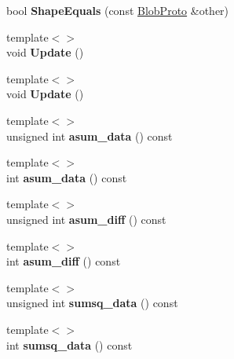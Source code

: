 \begin{DoxyCompactItemize}
\mbox{\label{classcaffe_1_1_blob_aaf5af1d79ac66f15dd5ebe504b36efcd}} 
bool {\bfseries Shape\+Equals} (const \mbox{\hyperlink{classcaffe_1_1_blob_proto}{Blob\+Proto}} \&other)
\item 
\mbox{\label{classcaffe_1_1_blob_a128b3c929b6282d8741543044b81894b}} 
{\footnotesize template$<$$>$ }\\void {\bfseries Update} ()
\item 
\mbox{\label{classcaffe_1_1_blob_a7da970e54e58626753ddd73955164481}} 
{\footnotesize template$<$$>$ }\\void {\bfseries Update} ()
\item 
\mbox{\label{classcaffe_1_1_blob_aaca009ba67cbcd12c18cf3a766db934f}} 
{\footnotesize template$<$$>$ }\\unsigned int {\bfseries asum\+\_\+data} () const
\item 
\mbox{\label{classcaffe_1_1_blob_a7104c5eb03f4307dd65bb098ad4c1a66}} 
{\footnotesize template$<$$>$ }\\int {\bfseries asum\+\_\+data} () const
\item 
\mbox{\label{classcaffe_1_1_blob_aba736c86a9d3bdc798bcc6551725f9a9}} 
{\footnotesize template$<$$>$ }\\unsigned int {\bfseries asum\+\_\+diff} () const
\item 
\mbox{\label{classcaffe_1_1_blob_a1725a104ce88a7eb466f1d1fb3f9cf95}} 
{\footnotesize template$<$$>$ }\\int {\bfseries asum\+\_\+diff} () const
\item 
\mbox{\label{classcaffe_1_1_blob_acac953b71e67c041755151f78a20405f}} 
{\footnotesize template$<$$>$ }\\unsigned int {\bfseries sumsq\+\_\+data} () const
\item 
\mbox{\label{classcaffe_1_1_blob_a91285b7a182d4927520b7d1ede18ed20}} 
{\footnotesize template$<$$>$ }\\int {\bfseries sumsq\+\_\+data} () const

\end{DoxyCompactItemize}

